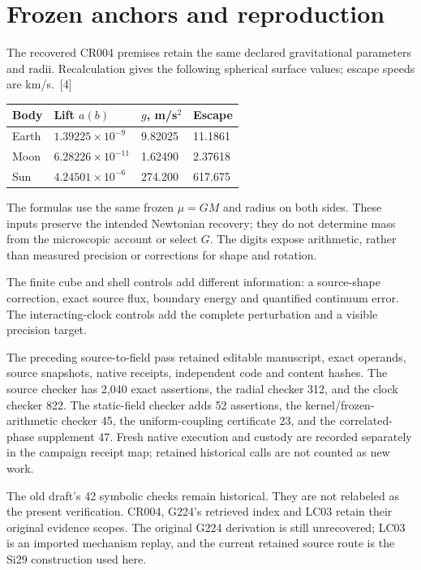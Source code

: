 \documentclass[10pt,twocolumn,letterpaper]{article}
\begin{document}
\section{Frozen anchors and reproduction}
The recovered CR004 premises retain the same declared gravitational parameters and radii. Recalculation gives the following spherical surface values; escape speeds are km/s.~[4]
\begin{center}
\small\setlength{\tabcolsep}{3pt}
\begin{tabular}{@{}llll@{}}\toprule
Body & Lift $a(b)$ & $g$, m/s$^2$ & Escape\\\midrule
Earth & $1.39225\times10^{-9}$ &9.82025&11.1861\\
Moon & $6.28226\times10^{-11}$ &1.62490&2.37618\\
Sun & $4.24501\times10^{-6}$ &274.200&617.675\\\bottomrule
\end{tabular}
\end{center}
The formulas use the same frozen $\mu=GM$ and radius on both sides. These inputs preserve the intended Newtonian recovery; they do not determine mass from the microscopic account or select $G$. The digits expose arithmetic, rather than measured precision or corrections for shape and rotation.

The finite cube and shell controls add different information: a source-shape correction, exact source flux, boundary energy and quantified continuum error. The interacting-clock controls add the complete perturbation and a visible precision target.

The preceding source-to-field pass retained editable manuscript, exact operands, source snapshots, native receipts, independent code and content hashes. The source checker has 2,040 exact assertions, the radial checker 312, and the clock checker 822. The static-field checker adds 52 assertions, the kernel/frozen-arithmetic checker 45, the uniform-coupling certificate 23, and the correlated-phase supplement 47. Fresh native execution and custody are recorded separately in the campaign receipt map; retained historical calls are not counted as new work.

The old draft's 42 symbolic checks remain historical. They are not relabeled as the present verification. CR004, G224's retrieved index and LC03 retain their original evidence scopes. The original G224 derivation is still unrecovered; LC03 is an imported mechanism replay, and the current retained source route is the Si29 construction used here.
\end{document}
